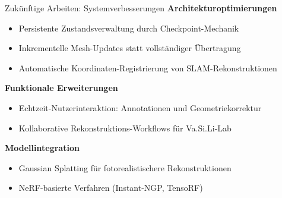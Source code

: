 \begin{frame}{Zukünftige Arbeiten: Systemverbesserungen}{}
    \textbf{Architekturoptimierungen}
    \begin{itemize}
        \itemsep0.4em
        \item Persistente Zustandsverwaltung durch Checkpoint-Mechanik
        \item Inkrementelle Mesh-Updates statt vollständiger Übertragung
        \item Automatische Koordinaten-Registrierung von SLAM-Rekonstruktionen
    \end{itemize}
    
    \vfill
    
    \textbf{Funktionale Erweiterungen}
    \begin{itemize}
        \itemsep0.4em
        \item Echtzeit-Nutzerinteraktion: Annotationen und Geometriekorrektur
        \item Kollaborative Rekonstruktions-Workflows für Va.Si.Li-Lab
    \end{itemize}

    \vfill

    \textbf{Modellintegration}
    \begin{itemize}
        \itemsep0.4em
        \item Gaussian Splatting für fotorealistischere Rekonstruktionen
        \item NeRF-basierte Verfahren (Instant-NGP, TensoRF)
    \end{itemize}
\end{frame}

    
    
